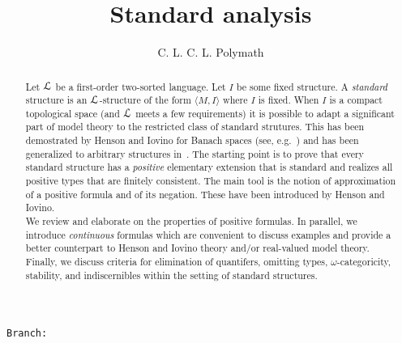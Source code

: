 \documentclass[10pt,oneside]{amsproc}
\author{C. L. C. L. Polymath}
\newcommand\branch{}
\begin{document}
\title{Standard analysis}
\hfill\texttt{Branch:\ \branch\ \DTMnow}\bigskip
\maketitle
\raggedbottom

\begin{abstract}
  Let ${\EuScript L}$ be a first-order two-sorted language.
  Let $I$ be some fixed structure.
  A \textit{standard\/} structure is an ${\EuScript L}$-structure of the form $\langle M,I\rangle$ where $I$ is fixed.
  When $I$ is a compact topological space (and ${\EuScript L}$ meets a few requirements) it is possible to adapt a significant part of model theory to the restricted class of standard strutures.
  This has been demostrated by Henson and Iovino for Banach spaces (see, e.g.~\cite{HI}) and has been generalized to arbitrary structures in~\cite{clcl}.
  The starting point is to prove that every standard structure has a \textit{positive\/} elementary extension that is standard and realizes all positive types that are finitely consistent.
  The main tool is the notion of approximation of a positive formula and of its negation.
  These have been introduced by Henson and Iovino.\\[1ex]
  \noindent
  We review and elaborate on the properties of positive formulas.
  In parallel, we introduce \textit{continuous\/} formulas which are convenient to discuss examples and provide a better counterpart to Henson and Iovino theory and/or real-valued model theory.
  Finally, we discuss criteria for elimination of quantifers, omitting types, $\omega$-categoricity, stability, and indiscernibles within the setting of standard structures.
\end{abstract}




\end{document}
